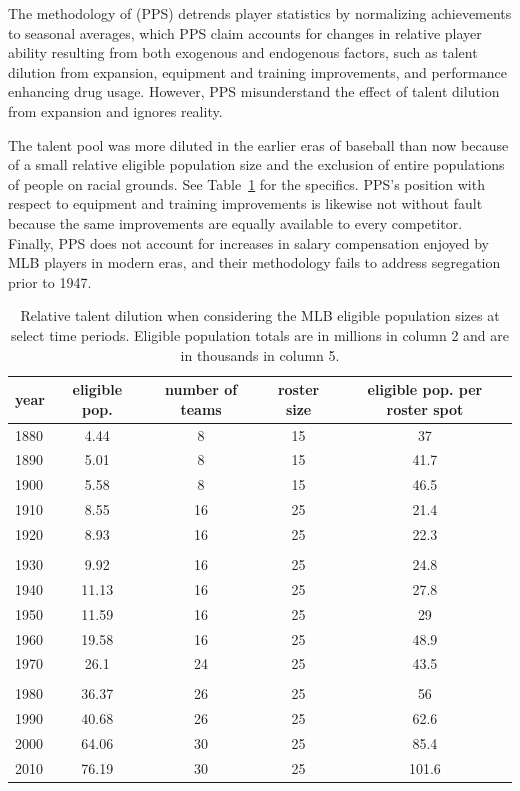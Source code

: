 \documentclass[11pt]{article}\usepackage[]{graphicx}\usepackage[]{color}
\begin{document}
The methodology of \citet{petersen} (PPS) detrends player statistics 
by normalizing achievements to seasonal averages, which PPS claim accounts 
for changes in relative player ability resulting from both exogenous and 
endogenous factors, such as talent dilution from expansion, equipment and 
training improvements, and performance enhancing drug usage. However, 
PPS misunderstand the effect of talent dilution from expansion and 
ignores reality.

The talent pool was more diluted in the earlier eras of 
baseball than now because of a small relative eligible population size and 
the exclusion of entire populations of people on racial grounds.  
See Table~\ref{dilution} for the specifics.  PPS's position with respect 
to equipment and training improvements is likewise not without fault 
because the same improvements are equally available to every competitor.  
Finally, PPS does not account for increases in salary compensation enjoyed by 
MLB players in modern eras, and their methodology fails to address 
segregation prior to 1947.


\begin{table}[h!]
\begin{center}
\begin{tabular}{lcccc}
\hline
year & eligible pop. & number of teams & roster size & eligible pop. per roster spot \\
\hline
1880 & 4.44  & 8  & 15 & 37   \\
1890 & 5.01  & 8  & 15 & 41.7   \\
1900 & 5.58  & 8  & 15 & 46.5   \\
1910 & 8.55  & 16 & 25 & 21.4  \\
1920 & 8.93  & 16 & 25 & 22.3  \\
  & & & &  \\
1930 & 9.92  & 16 & 25 & 24.8  \\
1940 & 11.13  & 16 & 25 & 27.8  \\
1950 & 11.59  & 16 & 25 & 29  \\
1960 & 19.58  & 16 & 25 & 48.9  \\
1970 & 26.1  & 24 & 25 & 43.5  \\
  & & & &  \\
1980 & 36.37 & 26 & 25 & 56 \\
1990 & 40.68 & 26 & 25 & 62.6 \\
2000 & 64.06 & 30 & 25 & 85.4 \\
2010 & 76.19 & 30 & 25 & 101.6 \\
\hline
\end{tabular}
\end{center}
\caption{Relative talent dilution when considering the MLB eligible population 
  sizes at select time periods. Eligible population totals are in millions in 
  column 2 and are in thousands in column 5. }
\label{dilution}
\end{table}
\end{document}
